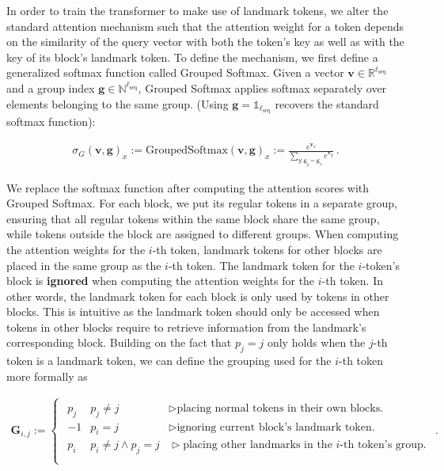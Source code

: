 In order to train the transformer to make use of landmark tokens, we alter the standard attention mechanism such that the attention weight for a token depends on the similarity of the query vector with both the token's key as well as with the key of its block's landmark token. To define the mechanism, we first define a generalized softmax function called Grouped Softmax. Given a vector $\mathbf{v} \in \mathbb{R}^{\ell_{\text{seq}}}$ and a group index $\mathbf{g} \in \mathbb{N}^{\ell_{\text{seq}}}$, Grouped Softmax applies softmax separately over elements belonging to the same group. (Using $\mathbf{g} = \mathds{1}_{\ell_{\text{seq}}}$ recovers the standard softmax function):

\begin{align}
	\sigma_G(\mathbf{v}, \mathbf{g})_x := \mathrm{GroupedSoftmax}(\mathbf{v}, \mathbf{g})_x := \frac{e^{\mathbf{v}_x}}{\sum_{y: \mathbf{g}_y = \mathbf{g}_x} e^{\mathbf{v}_y}} \, .
\end{align}

We replace the softmax function after computing the attention scores with Grouped Softmax. For each block, we put its regular tokens in a separate group, ensuring that all regular tokens within the same block share the same group, while tokens outside the block are assigned to different groups. When computing the attention weights for the $i$-th token, landmark tokens for other blocks are placed in the same group as the $i$-th token. The landmark token for the $i$-token's block is \textbf{ignored} when computing the attention weights for the $i$-th token. In other words, the landmark token for each block is only used by tokens in other blocks. This is intuitive as the landmark token should only be accessed when tokens in other blocks require to retrieve information from the landmark's corresponding block. Building on the fact that $p_j = j$ only holds when the $j$-th token is a landmark token, we can define the grouping used for the $i$-th token more formally as

\begin{align}
	\mathbf{G}_{i, j} := \begin{cases}\begin{array}{lll}
			p_j&  p_j \neq j &\vartriangleright\text{placing normal tokens in their own blocks.}\\
			-1 & p_i = j  &\vartriangleright\text{ignoring current block's landmark token.} \\
			p_i & p_i \neq j \wedge p_j = j  &\vartriangleright\text{placing other landmarks in the $i$-th token's group.} \\
	\end{array}\end{cases} .
\end{align}

